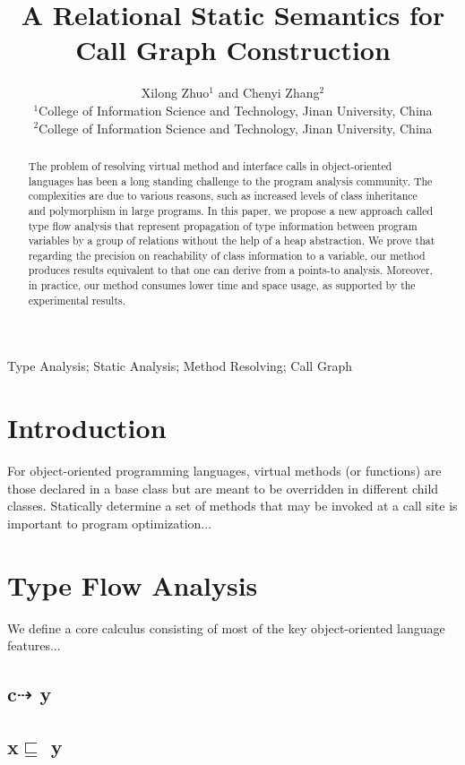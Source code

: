 \documentclass{fac}
\title{A Relational Static Semantics for\\
		Call Graph Construction}
\author[Xilong Zhuo and Chenyi Zhang]
    {Xilong Zhuo$^1$ and Chenyi Zhang$^2$\\
     $^1$College of Information Science and Technology, Jinan University, China\\
     $^2$College of Information Science and Technology, Jinan University, China}
\newcommand{\less}{\sqsubseteq}
\newcommand{\tflow}{\dashrightarrow}
\begin{document}
\label{firstpage}

\makecorrespond

\maketitle

\begin{abstract}
The problem of resolving virtual method and interface calls in object-oriented languages has been a long standing challenge to the program analysis community. The complexities are due to various reasons, such as increased levels of class inheritance and polymorphism in large programs. In this paper, we propose a new approach called type flow analysis that represent propagation of type information between program variables by a group of relations without the help of a heap abstraction. We prove that regarding the precision on reachability of class information to a variable, our method produces results equivalent to that one can derive from a points-to analysis. Moreover, in practice, our method consumes lower time and space usage, as supported by the experimental results.
\end{abstract}

\begin{keywords}
Type Analysis; Static Analysis; Method Resolving; Call Graph
\end{keywords}

\section{Introduction}

For object-oriented programming languages, virtual methods (or functions) are those declared in a base class but are meant to be overridden in different child classes. Statically determine a set of methods that may be invoked at a call site is important to program optimization...
\section{Type Flow Analysis}\label{sec:type-flow-analysis}
We define a core calculus consisting of most of the key object-oriented language features...
\subsection{c$\tflow$ y}
\subsection{x$\less$ y}
\end{document}
